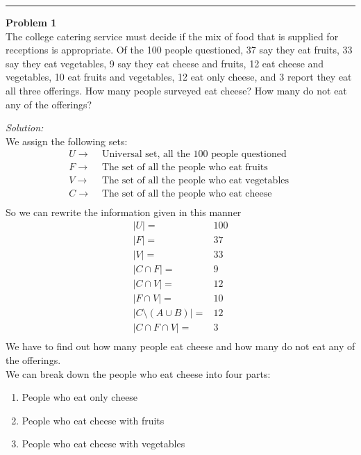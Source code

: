 \documentclass[11pt,letterpaper]{article}
\newenvironment{problem}[2][Problem]                                  
        { \begin{mdframed}[backgroundcolor=gray!20] \textbf{#1 #2} \\}
        {  \end{mdframed}}
\newenvironment{solution}                      
        {\begin{mdframed}\textit{Solution:} \\}
        {\end{mdframed}}
\begin{document}
\noindent\rule{\textwidth}{0.1mm}

\bigskip
\bigskip

\begin{problem}{1}
The college catering service must decide if the mix of food that is supplied for receptions is appropriate. Of the 100 people questioned, 37 say they eat fruits, 33 say they eat vegetables, 9 say they eat cheese and fruits, 12 eat cheese and vegetables, 10 eat fruits and vegetables, 12 eat only cheese, and 3 report they eat all three offerings. How many people surveyed eat cheese? How many do not eat any of the offerings?
\end{problem}

\begin{solution}
  We assign the following sets:
  \begin{align*}
    U \rightarrow& \text{ Universal set, all the 100 people questioned }\\ 
    F \rightarrow& \text{ The set of all the people who eat fruits }\\ 
    V \rightarrow& \text{ The set of all the people who eat vegetables }\\ 
    C \rightarrow& \text{ The set of all the people who eat cheese }\\ 
  \end{align*}
  So we can rewrite the information given in this manner
  \begin{align*}
    \lvert U \rvert =& 100\\
    \lvert F \rvert =& 37\\
    \lvert V \rvert =& 33\\
    \lvert C \cap F \rvert =& 9\\
    \lvert C \cap V \rvert =& 12\\
    \lvert F \cap V \rvert =& 10\\
    \lvert C \setminus (A \cup B) \rvert =& 12\\
    \lvert C \cap F \cap V \rvert =& 3\\
  \end{align*}
  We have to find out how many people eat cheese and how many do not eat any of the offerings. \\ 
  We can break down the people who eat cheese into four parts: 
  \begin{enumerate}
    \item People who eat only cheese 
    \item People who eat cheese with fruits
    \item People who eat cheese with vegetables

\end{enumerate}
\end{solution}
\end{document}
